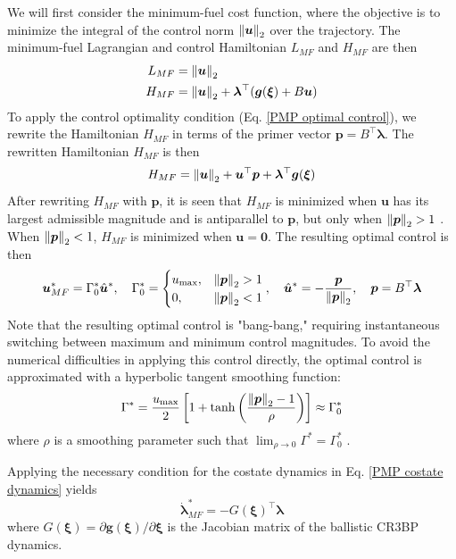 \documentclass[letterpaper, preprint, paper,11pt]{AAS}	%
\begin{document}
We will first consider the minimum-fuel cost function, where the objective is to minimize the integral of the control norm $\norm{\bm{u}}_2$ over the trajectory. The minimum-fuel Lagrangian and control Hamiltonian $L_{MF}$ and $H_{MF}$ are then
\begin{align}
    L_{MF} &= \norm{\bm{u}}_2 \\
    H_{MF} &= \norm{\bm{u}}_2 + \bm{\lambda}^\top (\bm{g}(\bm{\xi}) + B\bm{u})
\end{align}
To apply the control optimality condition (Eq. \ref{PMP optimal control}), we rewrite the Hamiltonian $H_{MF}$ in terms of the primer vector $\bm{p} = B^\top \bm{\lambda}$. The rewritten Hamiltonian $H_{MF}$ is then
\begin{equation}
    H_{MF} = \norm{\bm{u}}_2 + \bm{u}^\top \bm{p} + \bm{\lambda}^\top \bm{g}(\bm{\xi})
\end{equation}
After rewriting $H_{MF}$ with $\bm{p}$, it is seen that $H_{MF}$ is minimized when $\bm{u}$ has its largest admissible magnitude and is antiparallel to $\bm{p}$, but only when $\norm{\bm{p}}_2 > 1$ \cite{lawden1963optimal}. When $\norm{\bm{p}}_2 < 1$, $H_{MF}$ is minimized when $\bm{u} = \bm{0}$. The resulting optimal control is then
\begin{equation}
    \bm{u}_{MF}^* = \Gamma^*_0 \hat{\bm{u}}^*, \quad \Gamma^*_0 = \begin{cases}
        u_{\text{max}}, & \norm{\bm{p}}_2 > 1 \\
        0, & \norm{\bm{p}}_2 < 1
    \end{cases}, \quad \hat{\bm{u}}^* = -\frac{\bm{p}}{\norm{\bm{p}}_2}, \quad \bm{p} = B^\top \bm{\lambda} \label{eq:min-fuel control}
\end{equation}
Note that the resulting optimal control is "bang-bang," requiring instantaneous switching between maximum and minimum control magnitudes. To avoid the numerical difficulties in applying this control directly, the optimal control is approximated with a hyperbolic tangent smoothing function:  
\begin{equation}
    \Gamma^* = \frac{u_{\text{max}}}{2} \left[1 + \tanh \left(\frac{\norm{\bm{p}}_2 - 1}{\rho} \right)\right] \approx \Gamma_0^* \label{hyperbolic tangent smoothing}
\end{equation}
\noindent where $\rho$ is a smoothing parameter such that $\lim_{\rho \rightarrow 0} \Gamma^* = \Gamma_0^*$ \cite{taheri2018generic, junkins2019exploration}.

Applying the necessary condition for the costate dynamics in Eq. \ref{PMP costate dynamics} yields
\begin{equation}
    \dot{\bm{\lambda}}_{MF}^* = -G(\bm{\xi})^\top \bm{\lambda} \label{eq:min-fuel-costate-dynamics}
\end{equation}
\noindent where $G(\bm{\xi}) = \partial \bm{g}(\bm{\xi})/\partial \bm{\xi}$ is the Jacobian matrix of the ballistic CR3BP dynamics.
\end{document}
